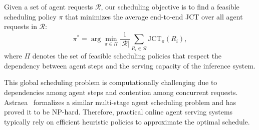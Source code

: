 Given a set of agent requests
$\mathcal{R}$, our scheduling objective is to find a feasible scheduling policy $\pi$ that minimizes the average end-to-end JCT over all agent requests in $\mathcal{R}$:
\begin{equation}
\pi^{*} = \arg\min_{\pi \in \Pi} \frac{1}{|\mathcal{R}|} \sum_{R_i \in \mathcal{R}} \mathrm{JCT}_{\pi}(R_i),
\end{equation}
where $\Pi$ denotes the set of feasible scheduling policies that respect the dependency between agent steps and the serving capacity of the inference system.

This global scheduling problem is computationally challenging due to dependencies among agent steps and contention among concurrent requests. 
Astraea~\citep{Astraea} formalizes a similar multi-stage agent scheduling problem and has proved it to be NP-hard. 
Therefore, practical online agent serving systems typically rely on efficient   heuristic policies to approximate the optimal schedule.